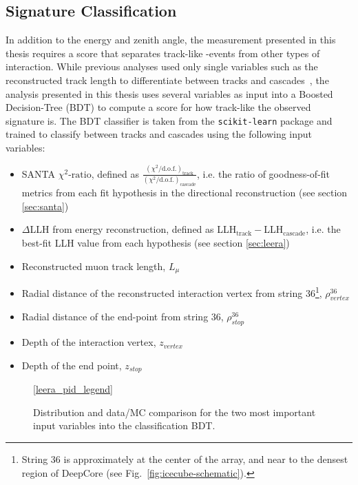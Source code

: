 \subsection{Signature Classification}
\label{sec:pid}
In addition to the energy and zenith angle, the measurement presented in this thesis requires a score that separates track-like \numucc-events from other types of interaction. While previous analyses used only single variables such as the reconstructed track length to differentiate between tracks and cascades~\cite{deepcore_sterile_2017, Aartsen_2015,IceCube:2019dqi}, the analysis presented in this thesis uses several variables as input into a Boosted Decision-Tree (BDT) to compute a score for how track-like the observed signature is. The BDT classifier is taken from the \texttt{scikit-learn}\cite{scikit-learn} package and trained to classify between tracks and cascades using the following input variables:
\begin{itemize}
    \item SANTA $\chi^2\textrm{-ratio}$, defined as  $\frac{(\chi^{2}/\mathrm{d.o.f.})_{\mathrm{track}}}{(\chi^{2}/\mathrm{d.o.f.})_{\mathrm{cascade}}}$, i.e. the ratio of goodness-of-fit metrics from each fit hypothesis in the directional reconstruction (see section \ref{sec:santa})
    \item $\Delta$LLH from energy reconstruction, defined as LLH$_\mathrm{track}-$LLH$_\mathrm{cascade}$, i.e. the best-fit LLH value from each hypothesis (see section \ref{sec:leera})
    \item Reconstructed muon track length, $L_{\mu}$
    \item Radial distance of the reconstructed interaction vertex from string 36\footnote{String 36 is approximately at the center of the array, and near to the densest region of DeepCore (see Fig.~\ref{fig:icecube-schematic}).}, $\rho^{36}_{vertex}$
    \item Radial distance of the end-point from string 36, $\rho^{36}_{stop}$
    \item Depth of the interaction vertex, $z_{vertex}$
    \item Depth of the end point, $z_{stop}$    
\end{itemize}
\begin{figure}
    \centering
    \ref{leera_pid_legend}

    
    
    
    \caption{Distribution and data/MC comparison for the two most important input variables into the classification BDT.}
    \label{fig:bdt-input-vars}
\end{figure}
